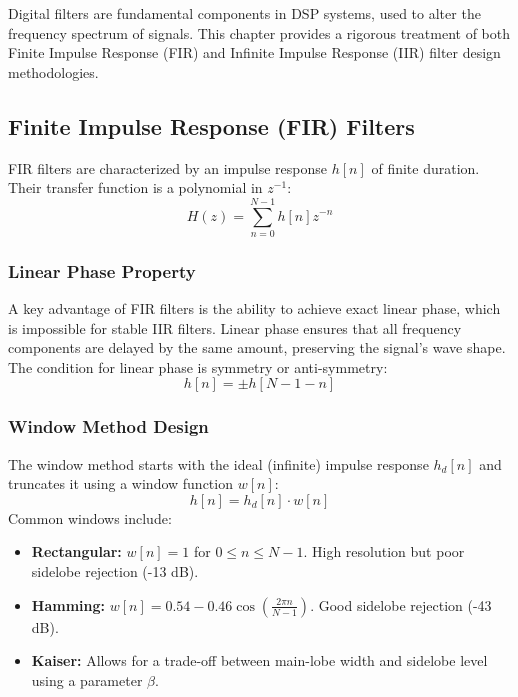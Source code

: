 
Digital filters are fundamental components in DSP systems, used to alter the frequency spectrum of signals. This chapter provides a rigorous treatment of both Finite Impulse Response (FIR) and Infinite Impulse Response (IIR) filter design methodologies.

\subsection{Finite Impulse Response (FIR) Filters}
FIR filters are characterized by an impulse response $h[n]$ of finite duration. Their transfer function is a polynomial in $z^{-1}$:
\begin{equation}
    H(z) = \sum_{n=0}^{N-1} h[n] z^{-n}
\end{equation}

\subsubsection{Linear Phase Property}
A key advantage of FIR filters is the ability to achieve exact linear phase, which is impossible for stable IIR filters. Linear phase ensures that all frequency components are delayed by the same amount, preserving the signal's wave shape.
The condition for linear phase is symmetry or anti-symmetry:
\begin{equation}
    h[n] = \pm h[N-1-n]
\end{equation}

\subsubsection{Window Method Design}
The window method starts with the ideal (infinite) impulse response $h_d[n]$ and truncates it using a window function $w[n]$:
\begin{equation}
    h[n] = h_d[n] \cdot w[n]
\end{equation}
Common windows include:
\begin{itemize}
    \item \textbf{Rectangular:} $w[n] = 1$ for $0 \leq n \leq N-1$. High resolution but poor sidelobe rejection (-13 dB).
    \item \textbf{Hamming:} $w[n] = 0.54 - 0.46 \cos\left(\frac{2\pi n}{N-1}\right)$. Good sidelobe rejection (-43 dB).
    \item \textbf{Kaiser:} Allows for a trade-off between main-lobe width and sidelobe level using a parameter $\beta$.
\end{itemize}

